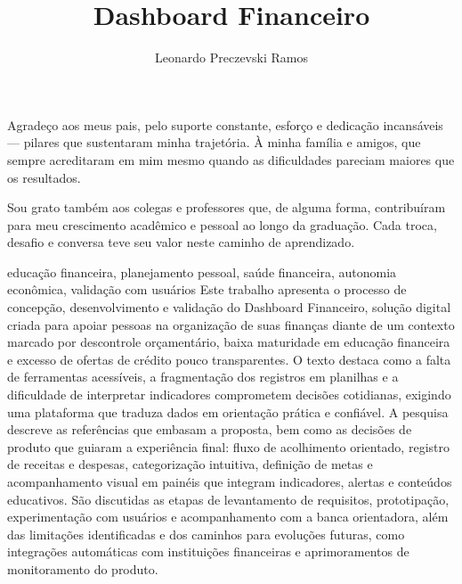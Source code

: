 \documentclass[portuguese,oneside]{tcc}
\author{Leonardo Preczevski Ramos}
\title{Dashboard Financeiro}
      {Financial Dashboard}
\begin{document}


\begin{agradecimentos}
Agradeço aos meus pais, pelo suporte constante, esforço e dedicação incansáveis — pilares que sustentaram minha trajetória.
À minha família e amigos, que sempre acreditaram em mim mesmo quando as dificuldades pareciam maiores que os resultados.

Sou grato também aos colegas e professores que, de alguma forma, contribuíram para meu crescimento acadêmico e pessoal ao longo da graduação.
Cada troca, desafio e conversa teve seu valor neste caminho de aprendizado.
\end{agradecimentos}

\begin{resumo}{educação financeira, planejamento pessoal, saúde financeira, autonomia econômica, validação com usuários}
Este trabalho apresenta o processo de concepção, desenvolvimento e validação do Dashboard Financeiro, solução digital criada para apoiar pessoas na organização de suas finanças diante de um contexto marcado por descontrole orçamentário, baixa maturidade em educação financeira e excesso de ofertas de crédito pouco transparentes. O texto destaca como a falta de ferramentas acessíveis, a fragmentação dos registros em planilhas e a dificuldade de interpretar indicadores comprometem decisões cotidianas, exigindo uma plataforma que traduza dados em orientação prática e confiável.
A pesquisa descreve as referências que embasam a proposta, bem como as decisões de produto que guiaram a experiência final: fluxo de acolhimento orientado, registro de receitas e despesas, categorização intuitiva, definição de metas e acompanhamento visual em painéis que integram indicadores, alertas e conteúdos educativos. São discutidas as etapas de levantamento de requisitos, prototipação, experimentação com usuários e acompanhamento com a banca orientadora, além das limitações identificadas e dos caminhos para evoluções futuras, como integrações automáticas com instituições financeiras e aprimoramentos de monitoramento do produto.
\end{resumo}
\end{document}
